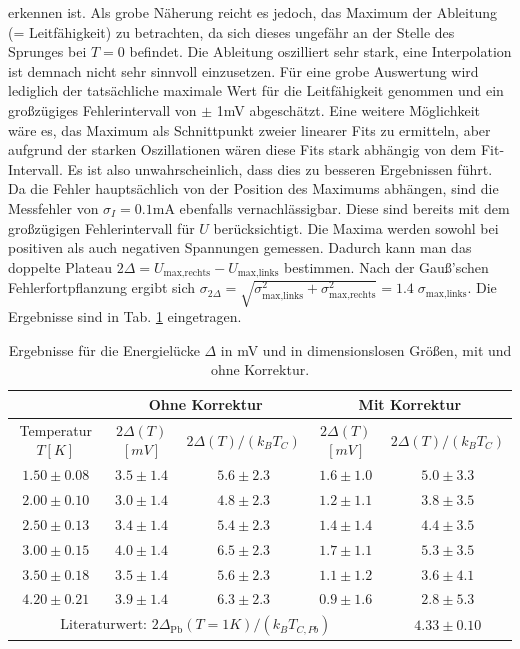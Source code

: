 \documentclass[twoside,        %
               BCOR12mm,       %
               english,ngerman, %
               fleqn,headsepline=false,footsepline=false
              ]{Vorlage/MFPREPORT}
\begin{document}
erkennen ist. Als grobe Näherung reicht es jedoch, das Maximum der Ableitung
(= Leitfähigkeit) zu
betrachten, da sich dieses ungefähr an der Stelle des Sprunges bei $T=0$
befindet. Die Ableitung oszilliert sehr stark, eine Interpolation ist demnach
nicht sehr sinnvoll einzusetzen. Für eine grobe Auswertung wird lediglich der
tatsächliche maximale Wert für die Leitfähigkeit genommen und ein großzügiges
Fehlerintervall von $\pm$ 1\;mV abgeschätzt. Eine weitere Möglichkeit wäre es,
das Maximum als Schnittpunkt zweier linearer Fits zu ermitteln, aber aufgrund
der starken Oszillationen wären diese Fits stark abhängig von dem
Fit-Intervall. Es ist also unwahrscheinlich, dass dies zu besseren Ergebnissen
führt. Da die Fehler hauptsächlich von der Position des Maximums abhängen, sind
die Messfehler von $\sigma_I=0.1$\;mA ebenfalls vernachlässigbar. Diese sind
bereits mit dem großzügigen Fehlerintervall für $U$ berücksichtigt. Die Maxima
werden sowohl bei positiven als auch negativen Spannungen gemessen. Dadurch
kann man das doppelte Plateau $2\Delta=U_{\text{max,rechts}}-U_{\text{max,links}}$ bestimmen.
Nach der Gauß'schen Fehlerfortpflanzung ergibt sich
$\sigma_{2\Delta}=\sqrt{\sigma_{\text{max,links}}^2+\sigma_{\text{max,rechts}}^2}=1.4\;\sigma_{\text{max,links}}$.
Die Ergebnisse sind in Tab. \ref{tab:res1} eingetragen.
\begin{table}[!h]
    \centering
    \begin{tabular}{|c|c|c|c|c|}
        \hline
        &\multicolumn{2}{|c|}{Ohne Korrektur}&\multicolumn{2}{|c|}{Mit
        Korrektur}\\\hline
        Temperatur $T [K]$&$2\Delta(T)$
        $[mV]$&$2\Delta(T)/(k_BT_C)$&$2\Delta(T)$
        $[mV]$&$2\Delta(T)/(k_BT_C)$\\\hline
        $1.50\pm0.08$&$3.5\pm1.4$&$5.6\pm2.3$&$1.6\pm1.0$&$5.0\pm3.3$\\\hline
        $2.00\pm0.10$&$3.0\pm1.4$&$4.8\pm2.3$&$1.2\pm1.1$&$3.8\pm3.5$\\\hline
        $2.50\pm0.13$&$3.4\pm1.4$&$5.4\pm2.3$&$1.4\pm1.4$&$4.4\pm3.5$\\\hline
        $3.00\pm0.15$&$4.0\pm1.4$&$6.5\pm2.3$&$1.7\pm1.1$&$5.3\pm3.5$\\\hline
        $3.50\pm0.18$&$3.5\pm1.4$&$5.6\pm2.3$&$1.1\pm1.2$&$3.6\pm4.1$\\\hline
        $4.20\pm0.21$&$3.9\pm1.4$&$6.3\pm2.3$&$0.9\pm1.6$&$2.8\pm5.3$\\\hline\hline
        \multicolumn{4}{|c|}{$\text{Literaturwert: }
        2\Delta_{\text{Pb}}(T=1K)/(k_BT_{C,Pb})$}&$4.33\pm0.10$
        \cite{giaever1961study}\\\hline

    \end{tabular}
    \caption{Ergebnisse für die Energielücke $\Delta$ in mV und in
    dimensionslosen Größen, mit und ohne Korrektur.}
    \label{tab:res1}
\end{table}
\end{document}
